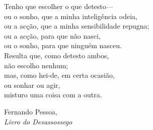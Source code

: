 \setlength{\epigraphwidth}{0.58\textwidth}
\setlength{\epigraphrule}{0pt}
\thispagestyle{empty}
\null{}
\epigraph{Tenho que escolher o que detesto---\\
  ou o sonho, que a minha inteligência odeia,\\
  ou a acção, que a minha sensibilidade repugna;\\
  ou a acção, para que não nasci,\\
  ou o sonho, para que ninguém nasceu.\\
  Resulta que, como detesto ambos,\\
  não escolho nenhum;\\
  mas, como hei-de, em certa ocasião,\\
  ou sonhar ou agir,\\
  misturo uma coisa com a outra.\\
}{Fernando Pessoa,\\
  \emph{Livro do Desassossego}}
\null

